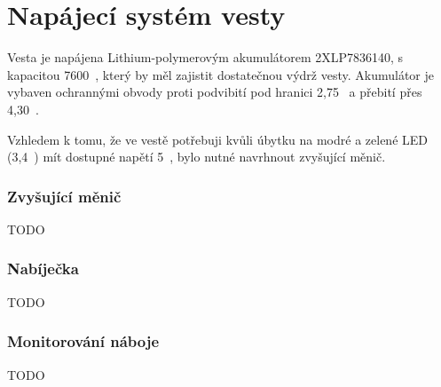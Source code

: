 \chapter{Napájecí systém vesty}
Vesta je napájena Lithium-polymerovým akumulátorem 2XLP7836140, s kapacitou 7600~, který by měl zajistit dostatečnou výdrž vesty. Akumulátor je vybaven ochrannými obvody proti podvibití pod hranici 2,75~ a přebití přes 4,30~.

Vzhledem k tomu, že ve vestě potřebuji kvůli úbytku na modré a zelené LED (3,4~) mít dostupné napětí 5~, bylo nutné navrhnout zvyšující měnič.

\subsection{Zvyšující měnič}
TODO

\subsection{Nabíječka}
TODO

\subsection{Monitorování náboje}
TODO
